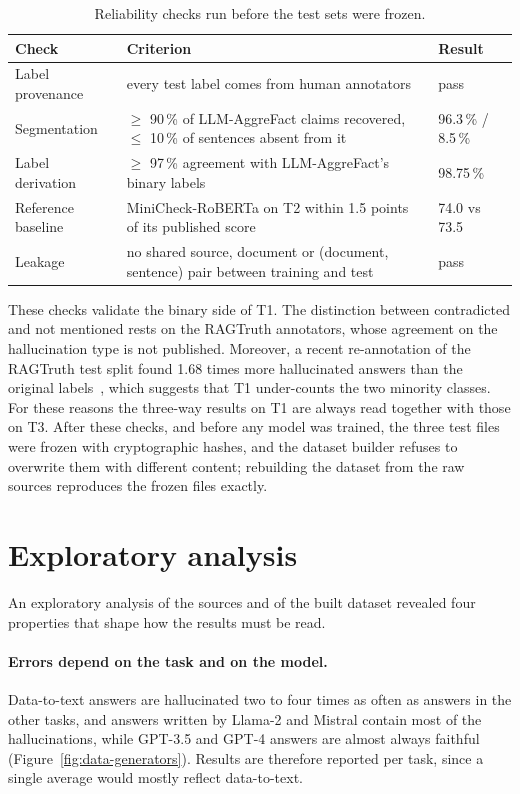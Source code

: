 \begin{table}[htbp]
\centering
\caption{Reliability checks run before the test sets were frozen.}
\label{tab:data-checks}
\small
\begin{tabularx}{\textwidth}{@{}lXl@{}}
\toprule
Check & Criterion & Result \\
\midrule
Label provenance & every test label comes from human annotators & pass \\
Segmentation & $\geq$ 90\,\% of LLM-AggreFact claims recovered, $\leq$ 10\,\% of sentences absent from it & 96.3\,\% / 8.5\,\% \\
Label derivation & $\geq$ 97\,\% agreement with LLM-AggreFact's binary labels & 98.75\,\% \\
Reference baseline & MiniCheck-RoBERTa on T2 within 1.5 points of its published score & 74.0 vs 73.5 \\
Leakage & no shared source, document or (document, sentence) pair between training and test & pass \\
\bottomrule
\end{tabularx}
\end{table}

These checks validate the binary side of T1. The distinction between contradicted and not mentioned rests on the
RAGTruth annotators, whose agreement on the hallucination type is not published. Moreover, a recent re-annotation of
the RAGTruth test split found 1.68 times more hallucinated answers than the original labels~\cite{yu2026retromorphic},
which suggests that T1 under-counts the two minority classes. For these reasons the three-way results on T1 are always
read together with those on T3. After these checks, and before any model was trained, the three test files were frozen
with cryptographic hashes, and the dataset builder refuses to overwrite them with different content; rebuilding the
dataset from the raw sources reproduces the frozen files exactly.

\section{Exploratory analysis}
\label{sec:data-eda}

An exploratory analysis of the sources and of the built dataset revealed four properties that shape how the results
must be read.

\paragraph{Errors depend on the task and on the model.} Data-to-text answers are hallucinated two to four times as
often as answers in the other tasks, and answers written by Llama-2 and Mistral contain most of the hallucinations,
while GPT-3.5 and GPT-4 answers are almost always faithful (Figure~\ref{fig:data-generators}). Results are therefore
reported per task, since a single average would mostly reflect data-to-text.

